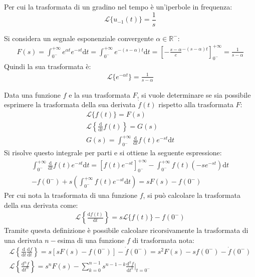 \documentclass{article}
\newcommand{\df}{\mathrm{d}}
\numberwithin{equation}{subsection}
\begin{document}
Per cui la trasformata di un gradino nel tempo è un'iperbole in frequenza:
\begin{equation}
    \mathcal{L}\{u_{-1}(t)\}=\displaystyle\frac{1}{s}
\end{equation}

Si considera un segnale esponenziale convergente $\alpha\in\mathbb{R}^-$:
\begin{gather*}
    F(s)=\displaystyle\int_{0^-}^{+\infty}e^{\alpha t}e^{-st}\df t=\int_{0^-}^{+\infty}e^{-(s-\alpha)t}\df t=\left[-\frac{s-\alpha}e^{-(s-\alpha)t}\right]^{+\infty}_{0^-}=\frac{1}{s-\alpha}
\end{gather*}
Quindi la sua trasformata è:
\begin{gather}
    \mathcal{L}\{e^{-\alpha t}\}=\displaystyle\frac{1}{s-\alpha}
\end{gather}


Data una funzione $f$ e la sua trasformata $F$, si vuole determinare se sia possibile esprimere la trasformata della sua derivata $\dot f(t)$ rispetto alla trasformata $F$:
\begin{gather*}
    \mathcal{L}\{f(t)\}=F(s)\\
    \mathcal{L}\left\{\displaystyle\frac{\df}{\df t}f(t)\right\}=G(s)\\
    G(s)=\displaystyle\int_{0^-}^{+\infty}\frac{\df}{\df t}f(t)e^{-st}\df t
\end{gather*}
Si risolve questo integrale per parti e si ottiene la seguente espressione:
\begin{gather*}
    \displaystyle\int_{0^-}^{+\infty}\frac{\df}{\df t}f(t)e^{-st}\df t=\left[f(t)e^{-st}\right]^{+\infty}_{0^-}-\int_{0^-}^{+\infty}f(t)(-se^{-st})\df t\\
    \displaystyle-f(0^-)+s\left(\int_{0^-}^{+\infty}f(t)e^{-st}\df t\right)=sF(s)-f(0^-) 
\end{gather*}
Per cui nota la trasformata di una funzione $f$, si può calcolare la trasformata della sua derivata come:
\begin{gather}
    \mathcal{L}\left\{\displaystyle\frac{\df f(t)}{\df t}\right\}=s\mathcal{L}\{f(t)\}-f(0^-)
\end{gather}
Tramite questa definizione è possibile calcolare ricorsivamente la trasformata di una derivata $n-$esima di una funzione $f$ di trasformata nota:
\begin{gather*}
    \mathcal{L}\left\{\displaystyle\frac{\df}{\df t}\frac{\df f}{\df t}\right\}=s\left[sF(s)-f(0^-)\right]-\dot f(0^-)=s^2F(s)-sf(0^-)-\dot f(0^-)\\
    \mathcal{L}\left\{\displaystyle\frac{\df^nf}{\df t^n}\right\}=s^nF(s)-\sum_{k=0}^{n-1}s^{n-1-k}\frac{\df^kf}{\df t^k}\Bigg|_{t=0^-}
\end{gather*}
\end{document}

